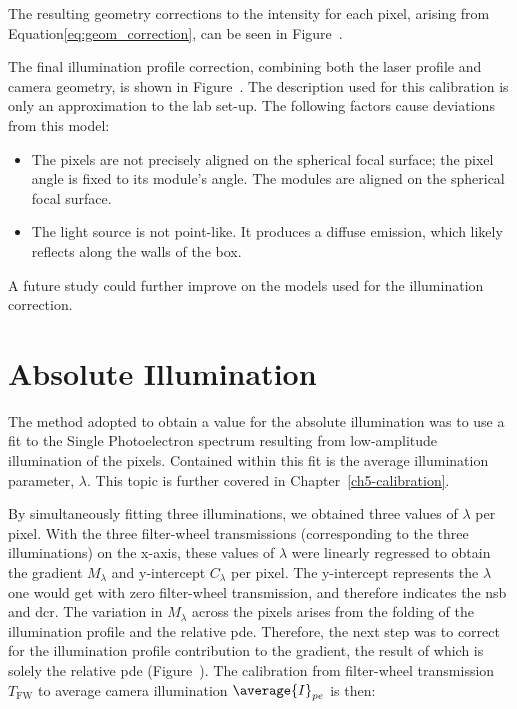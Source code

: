 The resulting geometry corrections to the intensity for each pixel, arising from Equation\ref{eq:geom_correction}, can be seen in Figure~. 

The final illumination profile correction, combining both the laser profile and camera geometry, is shown in Figure~. The description used for this calibration is only an approximation to the lab set-up. The following factors cause deviations from this model:
\begin{itemize}
\item The pixels are not precisely aligned on the spherical focal surface; the pixel angle is fixed to its module's angle. The modules are aligned on the spherical focal surface.
\item The light source is not point-like. It produces a diffuse emission, which likely reflects along the walls of the box.
\end{itemize}
A future study could further improve on the models used for the illumination correction.

\section{Absolute Illumination} \label{section:absolute_illumination}

The method adopted to obtain a value for the absolute illumination was to use a fit to the Single Photoelectron spectrum resulting from low-amplitude illumination of the pixels. Contained within this fit is the average illumination parameter, $\lambda$. This topic is further covered in Chapter~\ref{ch5-calibration}. 

By simultaneously fitting three illuminations, we obtained three values of $\lambda$ per pixel. With the three filter-wheel transmissions (corresponding to the three illuminations) on the x-axis, these values of $\lambda$ were linearly regressed to obtain the gradient $M_\lambda$ and y-intercept $C_\lambda$ per pixel. The y-intercept represents the $\lambda$ one would get with zero filter-wheel transmission, and therefore indicates the \gls{nsb} and \gls{dcr}. The variation in $M_\lambda$ across the pixels arises from the folding of the illumination profile and the relative \gls{pde}. Therefore, the next step was to correct for the illumination profile contribution to the gradient, the result of which is solely the relative \gls{pde} (Figure~). The calibration from filter-wheel transmission $T_\text{FW}$ to average camera illumination $\average{I}_{pe}$ is then:

